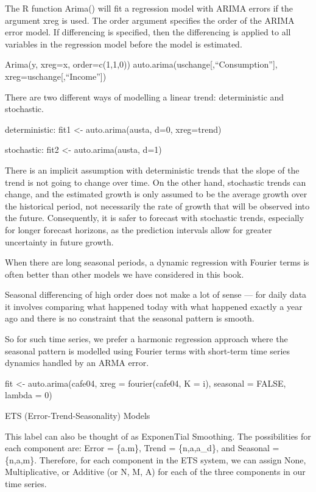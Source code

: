 \documentclass[]{book}
\begin{document}
The R function Arima() will fit a regression model with ARIMA errors if
the argument xreg is used. The order argument specifies the order of the
ARIMA error model. If differencing is specified, then the differencing
is applied to all variables in the regression model before the model is
estimated.

Arima(y, xreg=x, order=c(1,1,0))
auto.arima(uschange{[},``Consumption''{]},
xreg=uschange{[},``Income''{]})

There are two different ways of modelling a linear trend: deterministic
and stochastic.

deterministic: fit1 \textless{}- auto.arima(austa, d=0, xreg=trend)

stochastic: fit2 \textless{}- auto.arima(austa, d=1)

There is an implicit assumption with deterministic trends that the slope
of the trend is not going to change over time. On the other hand,
stochastic trends can change, and the estimated growth is only assumed
to be the average growth over the historical period, not necessarily the
rate of growth that will be observed into the future. Consequently, it
is safer to forecast with stochastic trends, especially for longer
forecast horizons, as the prediction intervals allow for greater
uncertainty in future growth.

When there are long seasonal periods, a dynamic regression with Fourier
terms is often better than other models we have considered in this book.

Seasonal differencing of high order does not make a lot of sense --- for
daily data it involves comparing what happened today with what happened
exactly a year ago and there is no constraint that the seasonal pattern
is smooth.

So for such time series, we prefer a harmonic regression approach where
the seasonal pattern is modelled using Fourier terms with short-term
time series dynamics handled by an ARMA error.

fit \textless{}- auto.arima(cafe04, xreg = fourier(cafe04, K = i),
seasonal = FALSE, lambda = 0)

ETS (Error-Trend-Seasonality) Models

This label can also be thought of as ExponenTial Smoothing. The
possibilities for each component are: Error = \{a.m\}, Trend =
\{n,a,a\_d\}, and Seasonal = \{n,a,m\}. Therefore, for each component in
the ETS system, we can assign None, Multiplicative, or Additive (or N,
M, A) for each of the three components in our time series.
\end{document}
